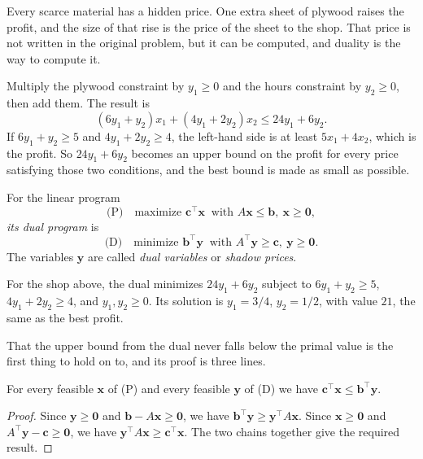Every scarce material has a hidden price. One extra sheet of plywood raises the profit, and the
size of that rise is the price of the sheet to the shop. That price is not written in the
original problem, but it can be computed, and duality is the way to compute it.

Multiply the plywood constraint by $y_{1}\ge0$ and the hours constraint by $y_{2}\ge0$, then
add them. The result is
\[
  (6y_{1}+y_{2})x_{1}+(4y_{1}+2y_{2})x_{2}\le24y_{1}+6y_{2}.
\]
If $6y_{1}+y_{2}\ge5$ and $4y_{1}+2y_{2}\ge4$, the left-hand side is at least
$5x_{1}+4x_{2}$, which is the profit. So $24y_{1}+6y_{2}$ becomes an upper bound on the profit
for every price satisfying those two conditions, and the best bound is made as small as
possible.

\begin{definisi}
For the linear program
\[
  \text{(P)}\quad \text{maximize } \mathbf{c}^{\top}\mathbf{x}
  \ \text{ with } A\mathbf{x}\le\mathbf{b},\ \mathbf{x}\ge\mathbf{0},
\]
\emph{its dual program} is
\[
  \text{(D)}\quad \text{minimize } \mathbf{b}^{\top}\mathbf{y}
  \ \text{ with } A^{\top}\mathbf{y}\ge\mathbf{c},\ \mathbf{y}\ge\mathbf{0}.
\]
The variables $\mathbf{y}$ are called \emph{dual variables} or \emph{shadow prices}.
\end{definisi}

For the shop above, the dual minimizes $24y_{1}+6y_{2}$ subject to
$6y_{1}+y_{2}\ge5$, $4y_{1}+2y_{2}\ge4$, and $y_{1},y_{2}\ge0$. Its solution is
$y_{1}=3/4$, $y_{2}=1/2$, with value $21$, the same as the best profit.

That the upper bound from the dual never falls below the primal value is the first thing to
hold on to, and its proof is three lines.

\begin{teorema}
For every feasible $\mathbf{x}$ of (P) and every feasible $\mathbf{y}$ of (D) we have
$\mathbf{c}^{\top}\mathbf{x}\le\mathbf{b}^{\top}\mathbf{y}$.
\end{teorema}

\begin{proof}
Since $\mathbf{y}\ge\mathbf{0}$ and $\mathbf{b}-A\mathbf{x}\ge\mathbf{0}$, we have
$\mathbf{b}^{\top}\mathbf{y}\ge\mathbf{y}^{\top}A\mathbf{x}$. Since
$\mathbf{x}\ge\mathbf{0}$ and $A^{\top}\mathbf{y}-\mathbf{c}\ge\mathbf{0}$, we have
$\mathbf{y}^{\top}A\mathbf{x}\ge\mathbf{c}^{\top}\mathbf{x}$. The two chains together give the
required result.
\end{proof}

